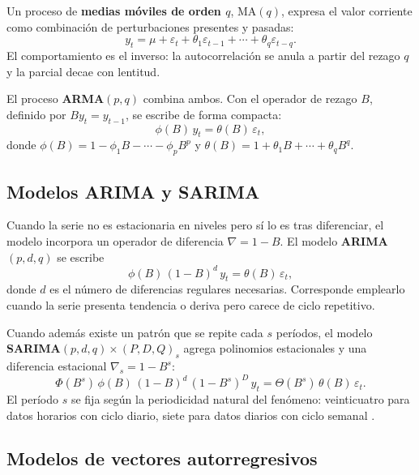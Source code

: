 Un proceso de \textbf{medias móviles de orden $q$}, MA$(q)$, expresa el valor corriente como
combinación de perturbaciones presentes y pasadas:
\begin{equation}
y_t = \mu + \varepsilon_t + \theta_1 \varepsilon_{t-1} + \cdots + \theta_q \varepsilon_{t-q}.
\end{equation}
El comportamiento es el inverso: la autocorrelación se anula a partir del rezago $q$ y la parcial decae con lentitud.

El proceso \textbf{ARMA$(p,q)$} combina ambos. Con el operador de rezago $B$, definido por
$B y_t = y_{t-1}$, se escribe de forma compacta:
\begin{equation}
\phi(B)\, y_t = \theta(B)\, \varepsilon_t,
\end{equation}
donde $\phi(B) = 1 - \phi_1 B - \cdots - \phi_p B^p$ y
$\theta(B) = 1 + \theta_1 B + \cdots + \theta_q B^q$.

\subsection{Modelos ARIMA y SARIMA}

Cuando la serie no es estacionaria en niveles pero sí lo es tras diferenciar, el modelo
incorpora un operador de diferencia $\nabla = 1 - B$. El modelo \textbf{ARIMA$(p,d,q)$} se escribe
\begin{equation}
\phi(B)\,(1-B)^d\, y_t = \theta(B)\, \varepsilon_t,
\end{equation}
donde $d$ es el número de diferencias regulares necesarias. Corresponde emplearlo cuando la
serie presenta tendencia o deriva pero carece de ciclo repetitivo.

Cuando además existe un patrón que se repite cada $s$ períodos, el modelo
\textbf{SARIMA$(p,d,q)\times(P,D,Q)_s$} agrega polinomios estacionales y una diferencia
estacional $\nabla_s = 1 - B^s$:
\begin{equation}
\Phi(B^s)\,\phi(B)\,(1-B)^d\,(1-B^s)^D\, y_t = \Theta(B^s)\,\theta(B)\, \varepsilon_t .
\end{equation}
El período $s$ se fija según la periodicidad natural del fenómeno: veinticuatro para datos
horarios con ciclo diario, siete para datos diarios con ciclo semanal
\parencite{hyndman2021}.

\subsection{Modelos de vectores autorregresivos}

